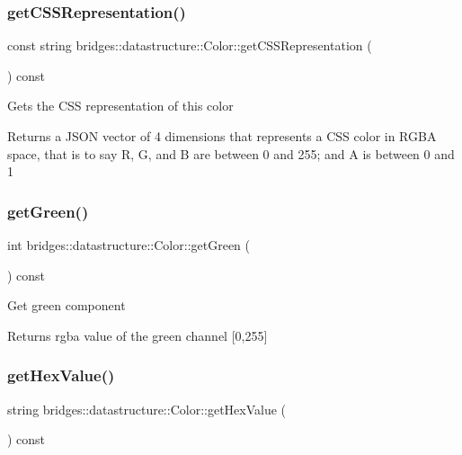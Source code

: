 \subsubsection{\texorpdfstring{get\+C\+S\+S\+Representation()}{getCSSRepresentation()}}
{\footnotesize\ttfamily const string bridges\+::datastructure\+::\+Color\+::get\+C\+S\+S\+Representation (\begin{DoxyParamCaption}{ }\end{DoxyParamCaption}) const\hspace{0.3cm}{\ttfamily [inline]}}

Gets the C\+SS representation of this color

\begin{DoxyReturn}{Returns}
a J\+S\+ON vector of 4 dimensions that represents a C\+SS color in R\+G\+BA space, that is to say R, G, and B are between 0 and 255; and A is between 0 and 1 
\end{DoxyReturn}
\mbox{\label{classbridges_1_1datastructure_1_1_color_a4e97402d8321374a6d97327dad603341}} 
\subsubsection{\texorpdfstring{get\+Green()}{getGreen()}}
{\footnotesize\ttfamily int bridges\+::datastructure\+::\+Color\+::get\+Green (\begin{DoxyParamCaption}{ }\end{DoxyParamCaption}) const\hspace{0.3cm}{\ttfamily [inline]}}

Get green component \begin{DoxyReturn}{Returns}
rgba value of the green channel \mbox{[}0,255\mbox{]} 
\end{DoxyReturn}
\mbox{\label{classbridges_1_1datastructure_1_1_color_a494648d2940754828f2054f92de031dc}} 
\subsubsection{\texorpdfstring{get\+Hex\+Value()}{getHexValue()}}
{\footnotesize\ttfamily string bridges\+::datastructure\+::\+Color\+::get\+Hex\+Value (\begin{DoxyParamCaption}{ }\end{DoxyParamCaption}) const\hspace{0.3cm}{\ttfamily [inline]}}

